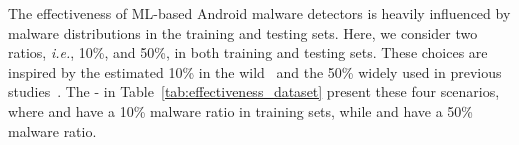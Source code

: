 

The effectiveness of ML-based Android malware detectors is heavily influenced by malware distributions in the training and testing sets.
Here, we consider two ratios, \textit{i.e.}, 10\%, and 50\%, in both training and testing sets.
These choices are inspired by the estimated 10\% in the wild~\cite{pendlebury2019tesseract,chen2023continuous} and the 50\% widely used in previous studies~\cite{wu2019malscan,li2021robust,mariconti2016mamadroid}.
The  -  in Table~\ref{tab:effectiveness_dataset} present these four scenarios, where  and  have a 10\% malware ratio in training sets, while  and  have a 50\% malware ratio.

